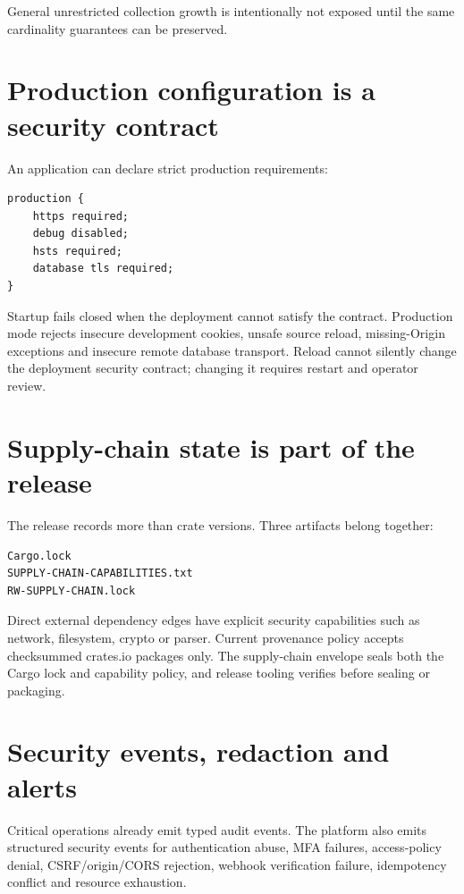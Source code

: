 General unrestricted collection growth is intentionally not exposed until the same cardinality guarantees can be preserved.

\section{Production configuration is a security contract}

An application can declare strict production requirements:

\begin{lstlisting}[language=RWLang]
production {
    https required;
    debug disabled;
    hsts required;
    database tls required;
}
\end{lstlisting}

Startup fails closed when the deployment cannot satisfy the contract. Production mode rejects insecure development cookies, unsafe source reload, missing-Origin exceptions and insecure remote database transport. Reload cannot silently change the deployment security contract; changing it requires restart and operator review.

\section{Supply-chain state is part of the release}

The release records more than crate versions. Three artifacts belong together:

\begin{lstlisting}
Cargo.lock
SUPPLY-CHAIN-CAPABILITIES.txt
RW-SUPPLY-CHAIN.lock
\end{lstlisting}

Direct external dependency edges have explicit security capabilities such as network, filesystem, crypto or parser. Current provenance policy accepts checksummed crates.io packages only. The supply-chain envelope seals both the Cargo lock and capability policy, and release tooling verifies  before sealing or packaging.

\section{Security events, redaction and alerts}

Critical operations already emit typed audit events. The platform also emits structured security events for authentication abuse, MFA failures, access-policy denial, CSRF/origin/CORS rejection, webhook verification failure, idempotency conflict and resource exhaustion.

